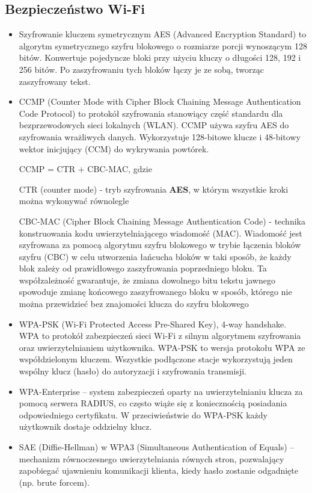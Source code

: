 \subsection{Bezpieczeństwo Wi-Fi}
\begin{itemize}
	\item Szyfrowanie kluczem symetrycznym AES (Advanced Encryption Standard) to algorytm symetrycznego szyfru blokowego o rozmiarze porcji wynoszącym 128 bitów. Konwertuje pojedyncze bloki przy użyciu kluczy o długości 128, 192 i 256 bitów. Po zaszyfrowaniu tych bloków łączy je ze sobą, tworząc zaszyfrowany tekst.
	\item CCMP (Counter Mode with Cipher Block Chaining Message Authentication Code Protocol) to protokół szyfrowania stanowiący część standardu dla bezprzewodowych sieci lokalnych (WLAN). CCMP używa szyfru AES do szyfrowania wrażliwych danych. Wykorzystuje 128-bitowe klucze i 48-bitowy wektor inicjujący (CCM) do wykrywania powtórek.

	      CCMP = CTR + CBC-MAC, gdzie

	      CTR (counter mode) - tryb szyfrowania \textbf{AES}, w którym wszystkie kroki można wykonywać równolegle

	      CBC-MAC (Cipher Block Chaining Message Authentication Code) - technika konstruowania kodu uwierzytelniającego wiadomość (MAC). Wiadomość jest szyfrowana za pomocą algorytmu szyfru blokowego w trybie łączenia bloków szyfru (CBC) w celu utworzenia łańcucha bloków w taki sposób, że każdy blok zależy od prawidłowego zaszyfrowania poprzedniego bloku. Ta współzależność gwarantuje, że zmiana dowolnego bitu tekstu jawnego spowoduje zmianę końcowego zaszyfrowanego bloku w sposób, którego nie można przewidzieć bez znajomości klucza do szyfru blokowego
	\item WPA-PSK (Wi-Fi Protected Access Pre-Shared Key), 4-way handshake. WPA to protokół zabezpieczeń sieci Wi-Fi z silnym algorytmem szyfrowania oraz uwierzytelnianiem użytkownika. WPA-PSK to wersja protokołu WPA ze współdzielonym kluczem. Wszystkie podłączone stacje wykorzystują jeden wspólny klucz (hasło) do autoryzacji i szyfrowania transmisji.
	\item WPA-Enterprise -- system zabezpieczeń oparty na uwierzytelnianiu klucza za pomocą serwera RADIUS, co często wiąże się z koniecznością posiadania odpowiedniego certyfikatu. W przeciwieństwie do WPA-PSK każdy użytkownik dostaje oddzielny klucz.
	\item SAE (Diffie-Hellman) w WPA3 (Simultaneous Authentication of Equals) -- mechanizm równoczesnego uwierzytelniania równych stron, pozwalający zapobiegać ujawnieniu komunikacji klienta, kiedy hasło zostanie odgadnięte (np. brute forcem).
\end{itemize}

